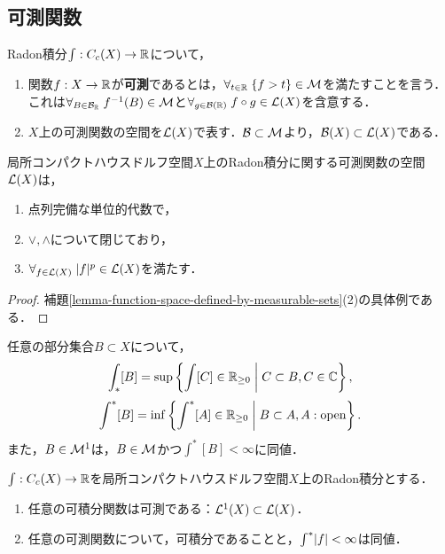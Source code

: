 \documentclass[uplatex,dvipdfmx]{jsreport}
\begin{document}
\subsection{可測関数}

\begin{definition}
    Radon積分$\int:C_c(X)\to\mathbb{R}$について，
    \begin{enumerate}
        \item 関数$f:X\to\mathbb{R}$が\textbf{可測}であるとは，$\forall_{t\in\mathbb{R}}\;\{f>t\}\in\mathcal{M}$を満たすことを言う．これは$\forall_{B\in\mathcal{B}_{\mathbb{R}}}\;f^{-1}(B)\in\mathcal{M}$と$\forall_{g\in\mathcal{B}(\mathbb{R})}\;f\circ g\in\mathcal{L}(X)$を含意する．
        \item $X$上の可測関数の空間を$\mathcal{L}(X)$で表す．$\mathcal{B}\subset\mathcal{M}$より，$\mathcal{B}(X)\subset\mathcal{L}(X)$である．
    \end{enumerate}
\end{definition}

\begin{proposition}
    局所コンパクトハウスドルフ空間$X$上のRadon積分に関する可測関数の空間$\mathcal{L}(X)$は，
    \begin{enumerate}
        \item 点列完備な単位的代数で，
        \item $\lor,\land$について閉じており，
        \item $\forall_{f\in\mathcal{L}(X)}\;\lvert f\rvert^p\in\mathcal{L}(X)$を満たす．
    \end{enumerate}
\end{proposition}
\begin{proof}
    補題\ref{lemma-function-space-defined-by-measurable-sets}(2)の具体例である．
\end{proof}

\begin{lemma}\label{lemma-regularity-of-Radon-integral}
    任意の部分集合$B\subset X$について，
    \[\int_*[B]=\sup\left\{\int[C]\in\mathbb{R}_{\ge0}\;\middle|\;C\subset B,C\in\mathbb{C}\right\},\]
    \[\int^*[B]=\inf\left\{\int^*[A]\in\mathbb{R}_{\ge0}\;\middle|\;B\subset A,A:\text{open}\right\}.\]
    また，$B\in\mathcal{M}^1$は，$B\in\mathcal{M}$かつ$\int^*[B]<\infty$に同値．
\end{lemma}

\begin{theorem}\label{thm-Radon-integrability}
    $\int:C_c(X)\to\mathbb{R}$を局所コンパクトハウスドルフ空間$X$上のRadon積分とする．
    \begin{enumerate}
        \item 任意の可積分関数は可測である：$\mathcal{L}^1(X)\subset\mathcal{L}(X)$．
        \item 任意の可測関数について，可積分であることと，$\int^*\lvert f\rvert<\infty$は同値．
    \end{enumerate}
\end{theorem}
\end{document}
